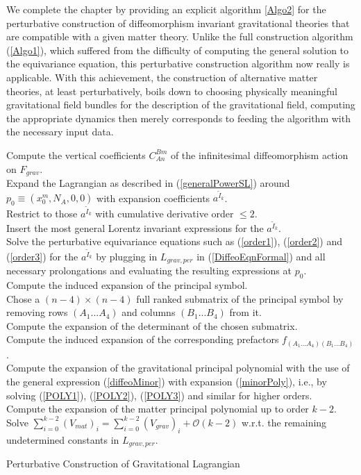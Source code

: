 We complete the chapter by providing an explicit algorithm \ref{Algo2} for the perturbative construction of diffeomorphism invariant gravitational theories that are compatible with a given matter theory. 
Unlike the full construction algorithm (\ref{Algo1}), which suffered from the difficulty of computing the general solution to the equivariance equation, this perturbative construction algorithm now really is applicable. 
With this achievement, the construction of alternative matter theories, at least perturbatively, boils down to choosing physically meaningful gravitational field bundles for the description of the gravitational field, computing the appropriate dynamics then merely corresponds to feeding the algorithm with the necessary input data.  
\begin{algorithm}[hbt!]
\SetAlgoLined
{}
Compute the vertical coefficients $C^{Bm}_{An}$ of the infinitesimal diffeomorphism action on $F_{grav}$. \\
Expand the Lagrangian as described in (\ref{generalPowerSL}) around $p_0 \equiv (x_0^m,N_A,0,0)$ with expansion coefficients $a^{\tilde{I}_k}$.\\
Restrict to those $a^{\tilde{I}_k}$ with cumulative derivative order $\leq 2$.\\
Insert the most general Lorentz invariant expressions for the $a^{\tilde{I}_k}$.\\
Solve the perturbative equivariance equations such as (\ref{order1}), (\ref{order2}) and (\ref{order3}) for the $a^{\tilde{I}_k}$ by plugging in $L_{grav,per}$ in (\ref{DiffeoEqnFormal}) and all necessary prolongations and evaluating the resulting expressions at $p_0$.\\
Compute the induced expansion of the principal symbol.\\
Chose a $(n-4) \times (n-4)$ full ranked submatrix of the principal symbol by removing rows $(A_1...A_4)$ and columns $(B_1...B_4)$ from it. \\
Compute the expansion of the determinant of the chosen submatrix.\\
Compute the induced expansion of the corresponding prefactors $f_{(A_1...A_4)(B_1...B_4)}$. \\
Compute the expansion of the gravitational principal polynomial with the use of the general expression (\ref{diffeoMinor}) with expansion (\ref{minorPoly}), i.e., by solving (\ref{POLY1}), (\ref{POLY2}), (\ref{POLY3}) and similar for higher orders. \\
Compute the expansion of the matter principal polynomial up to order $k-2$.\\
Solve $\sum_{i=0}^{k-2} (V_{mat})_i = \sum _{i=0}^{k-2}(V_{grav})_i + \mathcal{O}(k-2)$ w.r.t. the remaining undetermined constants in $L_{grav,per}$.
 \caption{Perturbative Construction of Gravitational Lagrangian}\label{Algo2}
\end{algorithm}

